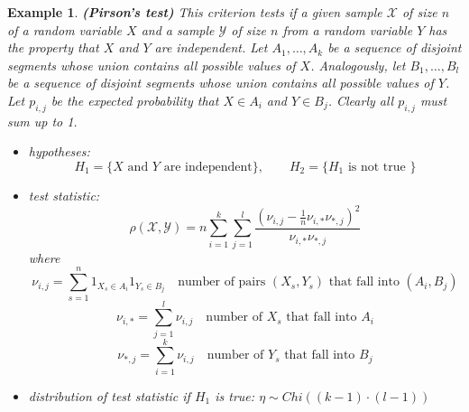 \documentclass[12pt]{article}
\newtheorem{example}[theorem]{Example}
\begin{document}
\begin{example} \textbf{(Pirson's test)} This criterion tests if a given sample
    $\mathscr{X}$ of size $n$ of a random variable $X$ and a sample
    $\mathscr{Y}$ of size $n$ from a random variable $Y$ has the property that
    $X$ and $Y$ are independent. Let $A_1,\ldots,A_k$ be a sequence of disjoint
    segments whose union contains all possible values of $X$. Analogously, let
    $B_1,\ldots,B_l$ be a sequence of disjoint segments whose union contains all
    possible values of $Y$. Let $p_{i,j}$ be the expected probability that $X\in
        A_i$ and $Y\in B_j$. Clearly all $p_{i,j}$ must sum up to 1.
    \begin{itemize}
        \item hypotheses:
              $$H_1=\{X\mbox{ and }Y\mbox{ are independent}\},\quad\quad
                  H_2=\{H_1\mbox{ is not true }\}$$
        \item test statistic:
              $$
                  \rho(\mathscr{X},\mathscr{Y})
                  =n\sum_{i=1}^k\sum_{j=1}^l\frac{
                      {\left(\nu_{i,j}-\frac{1}{n}\nu_{i,*}\nu_{*,j}\right)}^2
                  }{\nu_{i,*}\nu_{*,j}}
              $$
              where
              $$
                  \nu_{i,j}=\sum_{s=1}^n 1_{X_s\in A_i}1_{Y_s\in B_j}
                  \quad \mbox{number of pairs }(X_s,Y_s)
                  \mbox{ that fall into }(A_i,B_j)
              $$
              $$
                  \nu_{i,*}=\sum_{j=1}^{l}\nu_{i,j}
                  \quad \mbox{number of }X_s\mbox{ that fall into }A_i
              $$
              $$
                  \nu_{*,j}=\sum_{i=1}^{k}\nu_{i,j}
                  \quad \mbox{number of }Y_s\mbox{ that fall into }B_j
              $$

        \item distribution of test statistic if $H_1$ is true:
              $\eta\sim Chi((k-1)\cdot(l-1))$
    \end{itemize}
\end{example}
\end{document}
